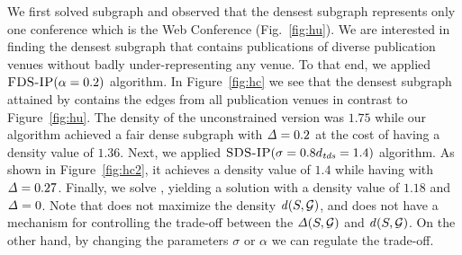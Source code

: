 We first solved \problemdts subgraph and observed that the densest subgraph represents only one conference which is the Web Conference (Fig.~\ref{fig:hu}). We are interested in finding the densest subgraph that contains publications of diverse publication venues without badly under-representing any venue. 
To that end, we applied $\textsc{FDS-IP}(\alpha = 0.2)$ algorithm. In Figure~\ref{fig:hc} we see that the densest subgraph attained by \algipcm contains the edges from all publication venues in contrast to Figure~\ref{fig:hu}. The density of the unconstrained version was $1.75$ while our algorithm achieved a fair dense subgraph with $\diff{} = 0.2$ at the cost of having a density value of $1.36$.
Next, we applied $\textsc{SDS-IP}(\sigma = 0.8d_{\mathit{tds}} = 1.4)$ algorithm. As shown in Figure~\ref{fig:hc2}, it achieves a density value of $1.4$ while having with $\diff{} = 0.27$. 
Finally, we solve \problemdcs, yielding a solution with a density value of $1.18$ and $\diff{} = 0$. Note that \problemdcs does not maximize the density $\dens{S, \calG}$, and does not have a mechanism for controlling the trade-off between the $\diff{S, \calG}$ and $\dens{S, \calG}$. On the other hand, by changing the parameters $\sigma$ or $\alpha$ we can regulate the trade-off.








